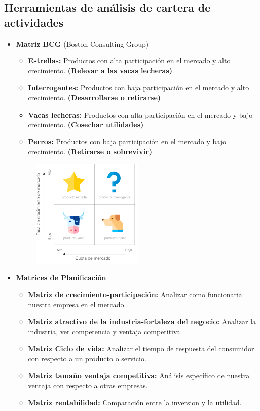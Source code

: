 \documentclass{templateNote}
\begin{document}
\begin{itemize}
    \subsection{Herramientas de análisis de cartera de actividades}
        \begin{itemize}
            \item \textbf{Matriz BCG} (Boston Consulting Group)
            \begin{itemize}
                \item \textbf{Estrellas:} Productos con alta participación en el mercado y alto crecimiento. \textbf{(Relevar a las vacas lecheras)}
                \item \textbf{Interrogantes:} Productos con baja participación en el mercado y alto crecimiento. \textbf{(Desarrollarse o retirarse)}
                \item \textbf{Vacas lecheras:} Productos con alta participación en el mercado y bajo crecimiento. \textbf{(Cosechar utilidades)}
                \item \textbf{Perros:} Productos con baja participación en el mercado y bajo crecimiento. \textbf{(Retirarse o sobrevivir)}
            \end{itemize}
            \begin{figure}[H]
                \centering
                \includegraphics[width=0.5\textwidth]{img/matriz_bcg-768x803.png}
            \end{figure}
            \item \textbf{Matrices de Planificación}
            \begin{itemize}
                \item \textbf{Matriz de crecimiento-participación:} Analizar como funcionaria nuestra empresa en el mercado.
                \item \textbf{Matriz atractivo de la industria-fortaleza del negocio:} Analizar la industria, ver competencia y ventaja competitiva.
                \item \textbf{Matriz Ciclo de vida:} Analizar el tiempo de respuesta del consumidor con respecto a un producto o servicio.
                \item \textbf{Matriz tamaño ventaja competitiva:} Análisis especifico de nuestra ventaja con respecto a otras empresas.
                \item \textbf{Matriz rentabilidad:} Comparación entre la inversion y la utilidad. 
            \end{itemize}
        \end{itemize}


\end{itemize}
\end{document}
